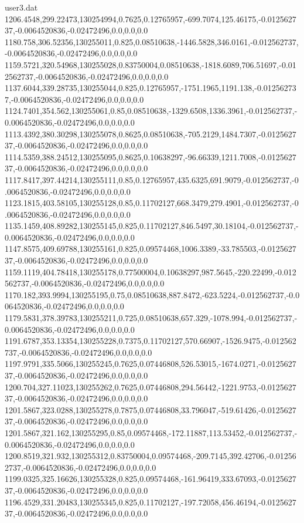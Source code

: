 \begin{filecontents}{user3.dat}
1206.4548,299.22473,130254994,0.7625,0.12765957,-699.7074,125.46175,-0.012562737,-0.0064520836,-0.02472496,0.0,0.0,0.0
1180.758,306.52356,130255011,0.825,0.08510638,-1446.5828,346.0161,-0.012562737,-0.0064520836,-0.02472496,0.0,0.0,0.0
1159.5721,320.54968,130255028,0.83750004,0.08510638,-1818.6089,706.51697,-0.012562737,-0.0064520836,-0.02472496,0.0,0.0,0.0
1137.6044,339.28735,130255044,0.825,0.12765957,-1751.1965,1191.138,-0.012562737,-0.0064520836,-0.02472496,0.0,0.0,0.0
1124.7401,354.562,130255061,0.85,0.08510638,-1329.6508,1336.3961,-0.012562737,-0.0064520836,-0.02472496,0.0,0.0,0.0
1113.4392,380.30298,130255078,0.8625,0.08510638,-705.2129,1484.7307,-0.012562737,-0.0064520836,-0.02472496,0.0,0.0,0.0
1114.5359,388.24512,130255095,0.8625,0.10638297,-96.66339,1211.7008,-0.012562737,-0.0064520836,-0.02472496,0.0,0.0,0.0
1117.8417,397.44214,130255111,0.85,0.12765957,435.6325,691.9079,-0.012562737,-0.0064520836,-0.02472496,0.0,0.0,0.0
1123.1815,403.58105,130255128,0.85,0.11702127,668.3479,279.4901,-0.012562737,-0.0064520836,-0.02472496,0.0,0.0,0.0
1135.1459,408.89282,130255145,0.825,0.11702127,846.5497,30.18104,-0.012562737,-0.0064520836,-0.02472496,0.0,0.0,0.0
1147.8575,409.69788,130255161,0.825,0.09574468,1006.3389,-33.785503,-0.012562737,-0.0064520836,-0.02472496,0.0,0.0,0.0
1159.1119,404.78418,130255178,0.77500004,0.10638297,987.5645,-220.22499,-0.012562737,-0.0064520836,-0.02472496,0.0,0.0,0.0
1170.182,393.9994,130255195,0.75,0.08510638,887.8472,-623.5224,-0.012562737,-0.0064520836,-0.02472496,0.0,0.0,0.0
1179.5831,378.39783,130255211,0.725,0.08510638,657.329,-1078.994,-0.012562737,-0.0064520836,-0.02472496,0.0,0.0,0.0
1191.6787,353.13354,130255228,0.7375,0.11702127,570.66907,-1526.9475,-0.012562737,-0.0064520836,-0.02472496,0.0,0.0,0.0
1197.9791,335.5066,130255245,0.7625,0.07446808,526.53015,-1674.0271,-0.012562737,-0.0064520836,-0.02472496,0.0,0.0,0.0
1200.704,327.11023,130255262,0.7625,0.07446808,294.56442,-1221.9753,-0.012562737,-0.0064520836,-0.02472496,0.0,0.0,0.0
1201.5867,323.0288,130255278,0.7875,0.07446808,33.796047,-519.61426,-0.012562737,-0.0064520836,-0.02472496,0.0,0.0,0.0
1201.5867,321.162,130255295,0.85,0.09574468,-172.11887,113.53452,-0.012562737,-0.0064520836,-0.02472496,0.0,0.0,0.0
1200.8519,321.932,130255312,0.83750004,0.09574468,-209.7145,392.42706,-0.012562737,-0.0064520836,-0.02472496,0.0,0.0,0.0
1199.0325,325.16626,130255328,0.825,0.09574468,-161.96419,333.67093,-0.012562737,-0.0064520836,-0.02472496,0.0,0.0,0.0
1196.4529,331.20483,130255345,0.825,0.11702127,-197.72058,456.46194,-0.012562737,-0.0064520836,-0.02472496,0.0,0.0,0.0

\end{filecontents}
